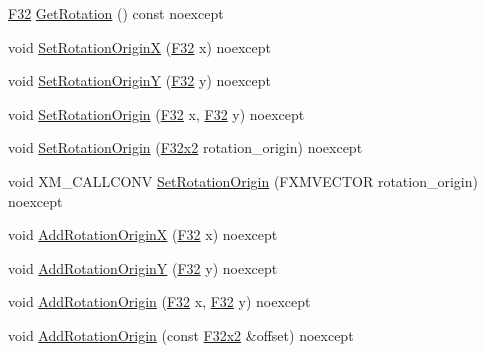 \begin{DoxyCompactItemize}
\item 
\mbox{\hyperlink{namespacemage_aa97e833b45f06d60a0a9c4fc22ae02c0}{F32}} \mbox{\hyperlink{classmage_1_1_sprite_transform2_d_ae455373b78cb49a3f75c92eac1f9f3d2}{Get\+Rotation}} () const noexcept
\item 
void \mbox{\hyperlink{classmage_1_1_sprite_transform2_d_a8931ab8ceec432689f1294dcd008cbf2}{Set\+Rotation\+OriginX}} (\mbox{\hyperlink{namespacemage_aa97e833b45f06d60a0a9c4fc22ae02c0}{F32}} x) noexcept
\item 
void \mbox{\hyperlink{classmage_1_1_sprite_transform2_d_a3a4e0919d0ae9423dba081e2ae01c1a2}{Set\+Rotation\+OriginY}} (\mbox{\hyperlink{namespacemage_aa97e833b45f06d60a0a9c4fc22ae02c0}{F32}} y) noexcept
\item 
void \mbox{\hyperlink{classmage_1_1_sprite_transform2_d_a0d33c669c2d06f75d630fa409e23b247}{Set\+Rotation\+Origin}} (\mbox{\hyperlink{namespacemage_aa97e833b45f06d60a0a9c4fc22ae02c0}{F32}} x, \mbox{\hyperlink{namespacemage_aa97e833b45f06d60a0a9c4fc22ae02c0}{F32}} y) noexcept
\item 
void \mbox{\hyperlink{classmage_1_1_sprite_transform2_d_a954b119c13cefc9f101b9a8352022b8a}{Set\+Rotation\+Origin}} (\mbox{\hyperlink{namespacemage_aee4759dedc8def6c6dec26b5c7eddf29}{F32x2}} rotation\+\_\+origin) noexcept
\item 
void X\+M\+\_\+\+C\+A\+L\+L\+C\+O\+NV \mbox{\hyperlink{classmage_1_1_sprite_transform2_d_a14593208cd356be5faaf95c907bb2382}{Set\+Rotation\+Origin}} (F\+X\+M\+V\+E\+C\+T\+OR rotation\+\_\+origin) noexcept
\item 
void \mbox{\hyperlink{classmage_1_1_sprite_transform2_d_ac768d48d273843c5ed35d31e1ff468cd}{Add\+Rotation\+OriginX}} (\mbox{\hyperlink{namespacemage_aa97e833b45f06d60a0a9c4fc22ae02c0}{F32}} x) noexcept
\item 
void \mbox{\hyperlink{classmage_1_1_sprite_transform2_d_a177f639c32e9c227ed8a9a810d450456}{Add\+Rotation\+OriginY}} (\mbox{\hyperlink{namespacemage_aa97e833b45f06d60a0a9c4fc22ae02c0}{F32}} y) noexcept
\item 
void \mbox{\hyperlink{classmage_1_1_sprite_transform2_d_a9197550b24d65aa34501b0686f919fe7}{Add\+Rotation\+Origin}} (\mbox{\hyperlink{namespacemage_aa97e833b45f06d60a0a9c4fc22ae02c0}{F32}} x, \mbox{\hyperlink{namespacemage_aa97e833b45f06d60a0a9c4fc22ae02c0}{F32}} y) noexcept
\item 
void \mbox{\hyperlink{classmage_1_1_sprite_transform2_d_a4f8c6b2f628d17e94cb15c997b3feb97}{Add\+Rotation\+Origin}} (const \mbox{\hyperlink{namespacemage_aee4759dedc8def6c6dec26b5c7eddf29}{F32x2}} \&offset) noexcept

\end{DoxyCompactItemize}
